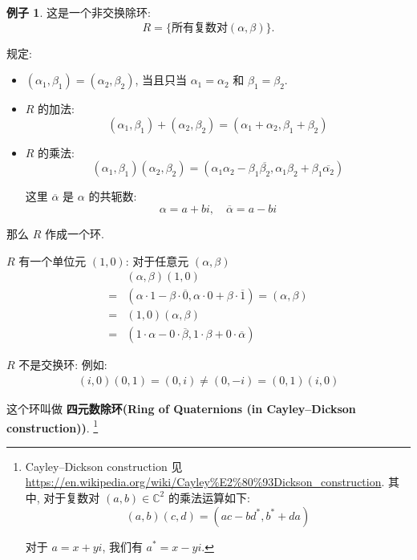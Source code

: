 \documentclass[utf8]{ctexbook}
\theoremstyle{definition}
\newtheorem{example}{例子}[section]
\begin{document}
\begin{example}
这是一个非交换除环:
\begin{equation}
R = \{ \mbox{所有复数对} (\alpha, \beta) \} .
\end{equation}

规定:
\begin{itemize}
\item{$(\alpha_1, \beta_1 ) = (\alpha_2, \beta_2 )$, 当且只当 $ \alpha_1 = \alpha_2$ 和 $\beta_1 = \beta_2 $.}
\item{$R$ 的加法:
\begin{equation}
(\alpha_1, \beta_1) + (\alpha_2, \beta_2) = (\alpha_1 + \alpha_2, \beta_1 + \beta_2)
\end{equation}
}
\item{$R$ 的乘法:
\begin{equation}
(\alpha_1, \beta_1) (\alpha_2, \beta_2) = ( \alpha_1 \alpha_2 - \beta_1 \overline{\beta_2}, \alpha_1 \beta_2 + \beta_1 \overline{\alpha_2} )
\end{equation}

这里 $\overline{\alpha}$ 是 $\alpha$ 的共轭数:
\begin{equation}
\alpha = a + b i , \quad \overline{\alpha} = a - b i
\end{equation}
}
\end{itemize}

那么 $R$ 作成一个环. 

$R$ 有一个单位元 $(1, 0)$: 对于任意元 $(\alpha, \beta)$
\begin{align*}
& (\alpha, \beta) (1, 0) \\
= & ( \alpha \cdot 1 - \beta \cdot \overline{0}, \alpha \cdot 0 + \beta \cdot \overline{1} ) = (\alpha, \beta) \\
= & (1, 0)  (\alpha, \beta) \\
= & ( 1 \cdot \alpha - 0 \cdot \overline{\beta}, 1 \cdot \beta + 0 \cdot \overline{\alpha} )
\end{align*}

$R$ 不是交换环: 例如:
\begin{align*}
(i, 0) (0, 1) = (0, i) \neq (0, -i) = (0, 1) (i, 0)
\end{align*}

这个环叫做 \textbf{四元数除环(Ring of Quaternions (in Cayley–Dickson construction))}. \footnote{Cayley–Dickson construction 见 \url{https://en.wikipedia.org/wiki/Cayley\%E2\%80\%93Dickson\_construction}. 其中, 对于复数对 $(a, b) \in \mathbb{C}^2$ 的乘法运算如下:
\begin{equation}
(a,b)(c,d) = (ac - bd^*, b^* + da)
\end{equation}

对于 $a= x + y i$, 我们有 $a^* = x - yi$.
}
\end{example}
\end{document}
